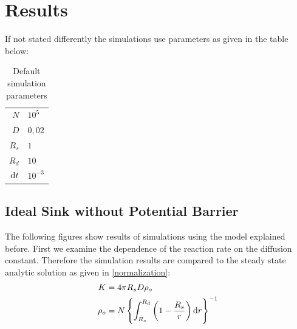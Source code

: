 \section{Results}
If not stated differently the simulations use parameters as given in the table below:
\begin{table}[H]
    \centering
    \begin{tabular}{r|l}
        $N$ & $10^{5}$\\
        $D$ & $0,02$\\
        $R_s$ & $1$ \\
        $R_d$ & $10$ \\
        ${\rm d}t$ & $10^{-3}$
    \end{tabular}
    \caption{Default simulation parameters}
    \label{tab:Parameters}
\end{table}

\subsection{Ideal Sink without Potential Barrier}
The following figures show results of simulations using the model explained before. First we examine the dependence of the reaction rate on the diffusion constant. Therefore the simulation results are compared to the steady state analytic solution as given in \eqref{normalization}:
\begin{align}
    K &= 4 \pi R_s D \rho_o \\
    \rho_o &= N \left\{ \int_{R_s}^{R_d} \left( 1 - \frac{R_s}{r} \right) {\rm d} r \right\}^{-1}
    \label{Steady_state_rate}
\end{align}
